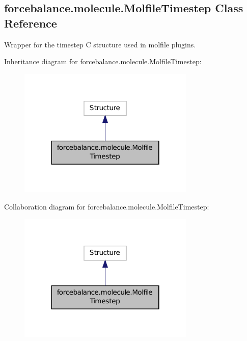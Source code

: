 \hypertarget{classforcebalance_1_1molecule_1_1MolfileTimestep}{\subsection{forcebalance.\-molecule.\-Molfile\-Timestep Class Reference}
\label{classforcebalance_1_1molecule_1_1MolfileTimestep}
}


Wrapper for the timestep C structure used in molfile plugins.  




Inheritance diagram for forcebalance.\-molecule.\-Molfile\-Timestep\-:
\nopagebreak
\begin{figure}[H]
\begin{center}
\leavevmode
\includegraphics[width=238pt]{classforcebalance_1_1molecule_1_1MolfileTimestep__inherit__graph}
\end{center}
\end{figure}


Collaboration diagram for forcebalance.\-molecule.\-Molfile\-Timestep\-:
\nopagebreak
\begin{figure}[H]
\begin{center}
\leavevmode
\includegraphics[width=238pt]{classforcebalance_1_1molecule_1_1MolfileTimestep__coll__graph}
\end{center}
\end{figure}


